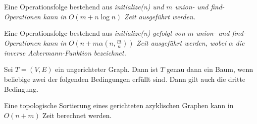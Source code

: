 \documentclass{cheat-sheet}
\newcommand{\code}[1]{\em{#1}}
\begin{document}




\begin{satz}
  Eine Operationsfolge bestehend aus \code{initialize(n)} und $m$ \code{union}- und \code{find}-Operationen kann in $O(m + n \log n)$ Zeit ausgeführt werden.
\end{satz}

\begin{satz}
  Eine Operationsfolge bestehend aus \code{initialize(n)} gefolgt von $m$ \code{union}- und \code{find}-Operationen kann in $O(n + m \alpha(n, \tfrac{m}{n}))$ Zeit ausgeführt werden, wobei $\alpha$ die inverse Ackermann-Funktion bezeichnet.
\end{satz}




\begin{lem}
  Sei $T = (V, E)$ ein ungerichteter Graph. Dann ist $T$ genau dann ein Baum, wenn beliebige zwei der folgenden Bedingungen erfüllt sind. Dann gilt auch die dritte Bedingung.
  \begin{itemize}
  \end{itemize}
\end{lem}





\begin{satz}
  Eine topologische Sortierung eines gerichteten azyklischen Graphen kann in $O(n+m)$ Zeit berechnet werden.
\end{satz}
\end{document}
